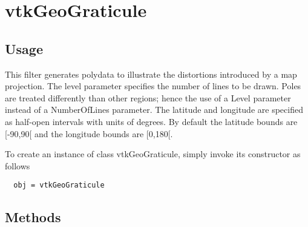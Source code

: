 \section{vtkGeoGraticule}

\subsection{Usage}

 This filter generates polydata to illustrate the distortions introduced
 by a map projection. The level parameter specifies the number of lines
 to be drawn. Poles are treated differently than other regions; hence the
 use of a Level parameter instead of a NumberOfLines parameter.
 The latitude and longitude are specified as half-open intervals with units
 of degrees. By default the latitude bounds are [-90,90[ and the longitude
 bounds are [0,180[.

To create an instance of class vtkGeoGraticule, simply
invoke its constructor as follows
\begin{verbatim}
  obj = vtkGeoGraticule
\end{verbatim}
\subsection{Methods}

